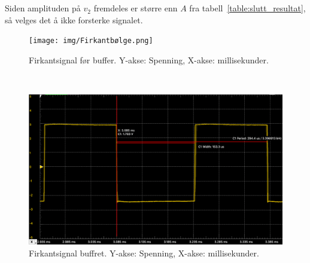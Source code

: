 \documentclass[a4paper,11pt,norsk]{article}
\begin{document}
\\\\
Siden amplituden på $v_2$ fremdeles er større enn $A$ fra tabell~\ref{table:slutt_resultat}, så velges det å ikke forsterke signalet.
\newpage
\\
\begin{figure}[htbp]
    \centering
    \texttt{[image: img/Firkantbølge.png]}
    \caption{Firkantsignal før buffer. Y-akse: Spenning, X-akse: millisekunder.}
    \label{fig:square_before_buffer}
\end{figure}\\
\newpage
\begin{figure}[htbp]
    \centering
    \includegraphics[width=1.0\textwidth]{img/Bøfret_firkantbølge.png}
    \caption{Firkantsignal buffret. Y-akse: Spenning, X-akse: millisekunder.}
    \label{fig:square_after_buffer}
\end{figure}\\

\newpage
\end{document}
